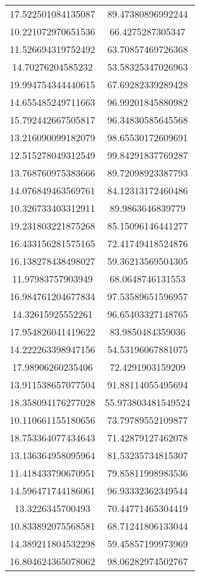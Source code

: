 \begin{table}
\begin{tabular}{cc}
17.522501084135087 & 89.47380896992244 \\
10.221072970651536 & 66.4275287305347 \\
11.526694319752492 & 63.70857469726368 \\
14.70276204585232 & 53.58325347026963 \\
19.994754344440615 & 67.69282339289428 \\
14.655485249711663 & 96.99201845880982 \\
15.792442667505817 & 96.34830585645568 \\
13.216090099182079 & 98.65530172609691 \\
12.515278049312549 & 99.84291837769287 \\
13.768760975383666 & 89.72098923387793 \\
14.076849463569761 & 84.12313172460486 \\
10.326733403312911 & 89.9863646839779 \\
19.231803221875268 & 85.15096146441277 \\
16.433156281575165 & 72.41749418524876 \\
16.138278438498027 & 59.36213569504305 \\
11.97983757903949 & 68.0648746131553 \\
16.984761204677834 & 97.53589651596957 \\
14.32615925552261 & 96.65403327148765 \\
17.954826041419622 & 83.9850484359036 \\
14.222263398947156 & 54.53196067881075 \\
17.98906260235406 & 72.4291903159209 \\
13.911538657077504 & 91.88114055495694 \\
18.358094176277028 & 55.973803481549524 \\
10.110661155180656 & 73.79789552109877 \\
18.753364077434643 & 71.42879127462078 \\
13.136364958095964 & 81.53235734815307 \\
11.418433790670951 & 79.85811998983536 \\
14.596471744186061 & 96.93332362349544 \\
13.3226345700493 & 70.44771465304419 \\
10.833892075568581 & 68.71241806133044 \\
14.389211804532298 & 59.45857199973969 \\
16.804624365078062 & 98.06282974502767 \\

\end{tabular}
\end{table}

